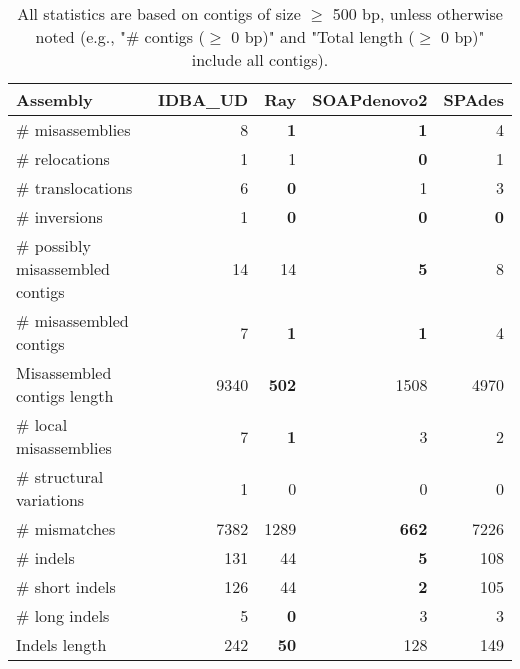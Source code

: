 \documentclass[12pt,a4paper]{article}
\begin{document}
\begin{table}[ht]
\begin{center}
\caption{All statistics are based on contigs of size $\geq$ 500 bp, unless otherwise noted (e.g., "\# contigs ($\geq$ 0 bp)" and "Total length ($\geq$ 0 bp)" include all contigs).}
\begin{tabular}{|l*{4}{|r}|}
\hline
Assembly & IDBA\_UD & Ray & SOAPdenovo2 & SPAdes \\ \hline
\# misassemblies & 8 & {\bf 1} & {\bf 1} & 4 \\ \hline
\hspace{5mm}\# relocations & 1 & 1 & {\bf 0} & 1 \\ \hline
\hspace{5mm}\# translocations & 6 & {\bf 0} & 1 & 3 \\ \hline
\hspace{5mm}\# inversions & 1 & {\bf 0} & {\bf 0} & {\bf 0} \\ \hline
\# possibly misassembled contigs & 14 & 14 & {\bf 5} & 8 \\ \hline
\# misassembled contigs & 7 & {\bf 1} & {\bf 1} & 4 \\ \hline
Misassembled contigs length & 9340 & {\bf 502} & 1508 & 4970 \\ \hline
\# local misassemblies & 7 & {\bf 1} & 3 & 2 \\ \hline
\# structural variations & 1 & 0 & 0 & 0 \\ \hline
\# mismatches & 7382 & 1289 & {\bf 662} & 7226 \\ \hline
\# indels & 131 & 44 & {\bf 5} & 108 \\ \hline
\hspace{5mm}\# short indels & 126 & 44 & {\bf 2} & 105 \\ \hline
\hspace{5mm}\# long indels & 5 & {\bf 0} & 3 & 3 \\ \hline
Indels length & 242 & {\bf 50} & 128 & 149 \\ \hline
\end{tabular}
\end{center}
\end{table}
\end{document}
